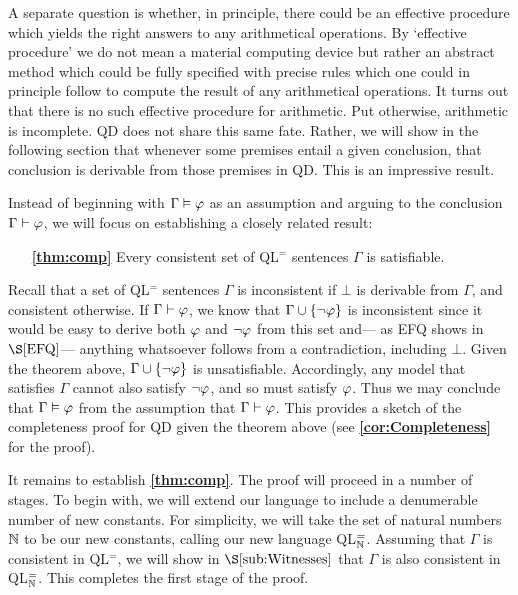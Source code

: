A separate question is whether, in principle, there could be an effective procedure which yields the right answers to any arithmetical operations.
By `effective procedure' we do not mean a material computing device but rather an abstract method which could be fully specified with precise rules which one could in principle follow to compute the result of any arithmetical operations.
It turns out that there is no such effective procedure for arithmetic.
Put otherwise, arithmetic is incomplete.
QD does not share this same fate.
Rather, we will show in the following section that whenever some premises entail a given conclusion, that conclusion is derivable from those premises in QD.
This is an impressive result.

Instead of beginning with $\Gamma\vDash\varphi$ as an assumption and arguing to the conclusion $\Gamma\vdash\varphi$, we will focus on establishing a closely related result: 
\begin{enumerate}[leftmargin=1.5in]
  \item[\textbf{\ref{thm:comp}}] Every consistent set of QL$^=$ sentences $\Gamma$ is satisfiable. 
\end{enumerate}
Recall that a set of QL$^=$ sentences $\Gamma$ is inconsistent if $\bot$ is derivable from $\Gamma$, and consistent otherwise.
If $\Gamma\vdash\varphi$, we know that $\Gamma\cup\lbrace\neg\varphi\rbrace$ is inconsistent since it would be easy to derive both $\varphi$ and $\neg\varphi$ from this set and--- as EFQ shows in $\S\ref{EFQ}$--- anything whatsoever follows from a contradiction, including $\bot$.
Given the theorem above, $\Gamma\cup\lbrace\neg\varphi\rbrace$ is unsatisfiable. 
Accordingly, any model that satisfies $\Gamma$ cannot also satisfy $\neg\varphi$, and so must satisfy $\varphi$. 
Thus we may conclude that $\Gamma\vDash\varphi$ from the assumption that $\Gamma\vdash\varphi$. 
This provides a sketch of the completeness proof for QD given the theorem above (see \textbf{\ref{cor:Completeness}} for the proof).

It remains to establish \textbf{\ref{thm:comp}}.
The proof will proceed in a number of stages.
To begin with, we will extend our language to include a denumerable number of new constants.
For simplicity, we will take the set of natural numbers $\mathbb{N}$ to be our new constants, calling our new language QL$^=_{\mathbb{N}}$. 
Assuming that $\Gamma$ is consistent in QL$^=$, we will show in $\S\ref{sub:Witnesses}$ that $\Gamma$ is also consistent in QL$^=_{\mathbb{N}}$.
This completes the first stage of the proof.

